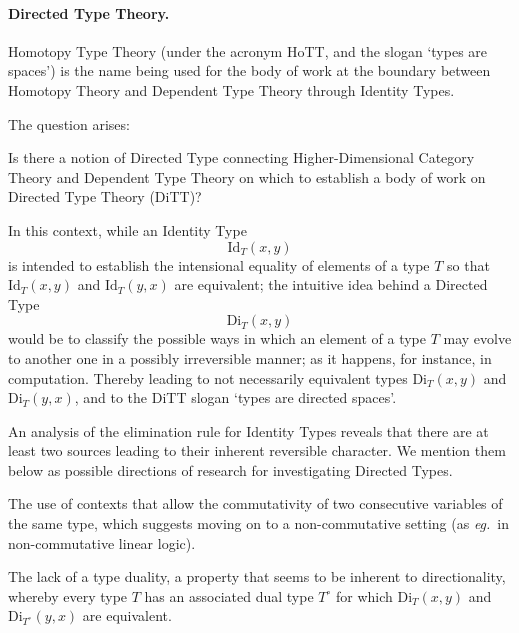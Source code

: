 \documentclass[11pt,twocolumn]{article}
\newcounter{CC}
\newenvironment{resenumerate}
  {\begin{list}{[\textbf{\arabic{CC}]}}
  {\usecounter{CC}
   \setlength{\topsep}{2pt}
   \setlength{\partopsep}{2pt}
   \setlength{\itemsep}{2.5pt}
   \setlength{\parsep}{2.5pt}
   \setlength{\leftmargin}{1.65em}
   \setlength{\labelwidth}{1.15em}
 }}
  {\end{list}}
\newcommand{\pref}[1]{\,(\ref{#1})}
\newcommand{\eg}{\emph{eg.}}
\newcommand{\Id}{\mathrm{Id}}
\newcommand{\Di}{\mathrm{Di}}
\begin{document}
\paragraph{Directed Type Theory.}
\label{DirectedTypeTheoryParagraph}

Homotopy Type Theory (under the acronym HoTT, and the slogan `types are
spaces') is the name being used for the body of work at the boundary between
Homotopy Theory and Dependent Type Theory through Identity Types.

The question arises:
\begin{resenumerate}\setcounter{CC}{0}
\item
  Is there a notion of Directed Type connecting Higher-Dimensional Category
  Theory and Dependent Type Theory on which to establish a body of work on
  Directed Type Theory (DiTT)?
\end{resenumerate}
In this context, while an Identity Type
\[
  \Id_T(x,y)
\]
is intended to establish the intensional equality of elements of a type $T$ so
that $\Id_T(x,y)$ and $\Id_T(y,x)$ are equivalent; the intuitive idea behind a
Directed Type 
\[
  \Di_T(x,y)
\]
would be to classify the possible ways in which an element of a type $T$ may
evolve to another one in a possibly irreversible manner; as it happens, for
instance, in computation.  Thereby leading to not necessarily equivalent types
$\Di_T(x,y)$ and $\Di_T(y,x)$, and to the DiTT slogan `types are directed
spaces'.

An analysis of the elimination rule for Identity Types reveals that there
are at least two sources leading to their inherent reversible character.
We mention them below as possible directions of research for investigating
Directed Types.
\begin{resenumerate}\setcounter{CC}{1}
\item
  The use of contexts that allow the commutativity of two consecutive
  variables of the same type, which suggests moving on to a non-commutative
  setting (as \eg~in non-commutative linear logic).

\item\label{TypeDualityItem}
  The lack of a type duality, a property that seems to be inherent to
  directionality, whereby every type $T$ has an associated dual type $T^\circ$
  for which $\Di_T(x,y)$ and $\Di_{T^\circ}(y,x)$ are equivalent.  
\end{resenumerate}
\end{document}
